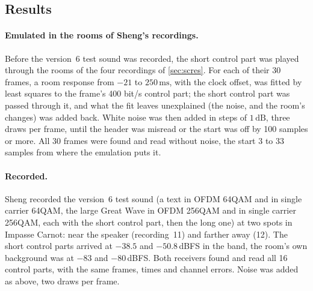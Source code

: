 \documentclass[11pt,a4paper]{article}
\newcommand{\ms}{\,\mathrm{ms}}
\newcommand{\dB}{\,\mathrm{dB}}
\theoremstyle{remark}
\begin{document}
\subsection{Results}
\label{sec:c6res}

\paragraph{Emulated in the rooms of Sheng's recordings.}
Before the version~6 test sound was recorded, the short control part was played through the rooms of the four recordings of \cref{sec:scres}. For each of their 30 frames, a room response from $-21$ to $250\ms$, with the clock offset, was fitted by least squares to the frame's 400 bit/s control part; the short control part was passed through it, and what the fit leaves unexplained (the noise, and the room's changes) was added back. White noise was then added in steps of $1\dB$, three draws per frame, until the header was misread or the start was off by 100 samples or more. All 30 frames were found and read without noise, the start 3 to 33 samples from where the emulation puts it.

\paragraph{Recorded.}
Sheng recorded the version~6 test sound (a text in OFDM 64QAM and in single carrier 64QAM, the large Great Wave in OFDM 256QAM and in single carrier 256QAM, each with the short control part, then the long one) at two spots in Impasse Carnot: near the speaker (recording~11) and farther away (12). The short control parts arrived at $-38.5$ and $-50.8$\,dBFS in the band, the room's own background was at $-83$ and $-80$\,dBFS. Both receivers found and read all 16 control parts, with the same frames, times and channel errors. Noise was added as above, two draws per frame.
\end{document}
